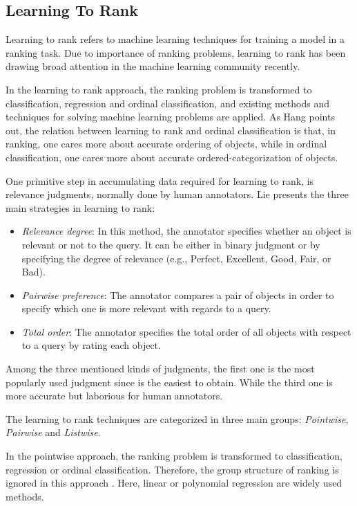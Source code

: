 \subsection{Learning To Rank}
Learning to rank refers to machine learning techniques for training a model in a ranking task. Due to importance of ranking problems, learning to rank has been drawing broad attention in the machine learning community recently. 

In the learning to rank approach, the ranking problem is transformed to classification, regression and ordinal classification, and existing methods and techniques for solving machine learning problems are applied. As Hang\cite{l2r-intro} points out, the relation between learning to rank and ordinal classification is that, in ranking, one cares more about accurate ordering of objects, while in ordinal classification, one cares more about accurate ordered-categorization of objects.

One primitive step in accumulating data required for learning to rank, is relevance judgments, normally done by human annotators. Lie \cite{l2r-book} presents the three main strategies in learning to rank:
\begin{itemize}
\item \textit{Relevance degree}: In this method, the annotator specifies whether an object is relevant or not to the query. It can be either in binary judgment or by specifying the degree of relevance (e.g., Perfect, Excellent, Good, Fair, or Bad).
\item \textit{Pairwise preference}: The annotator compares a pair of objects in order to specify which one is more relevant with regards to a query.
\item \textit{Total order}: The annotator specifies the total order of all objects with respect to a query by rating each object.
\end{itemize}

Among the three mentioned kinds of judgments, the first one is the most popularly used judgment since is the easiest to obtain. While the third one is more accurate but laborious for human annotators.

The learning to rank techniques are categorized in three main groups: \textit{Pointwise}, \textit{Pairwise} and \textit{Listwise}.

In the pointwise approach, the ranking problem is transformed to classification, regression or ordinal classification. Therefore, the group structure of ranking is ignored in this approach \cite{l2r-intro}. Here, linear or polynomial regression are widely used methods.

